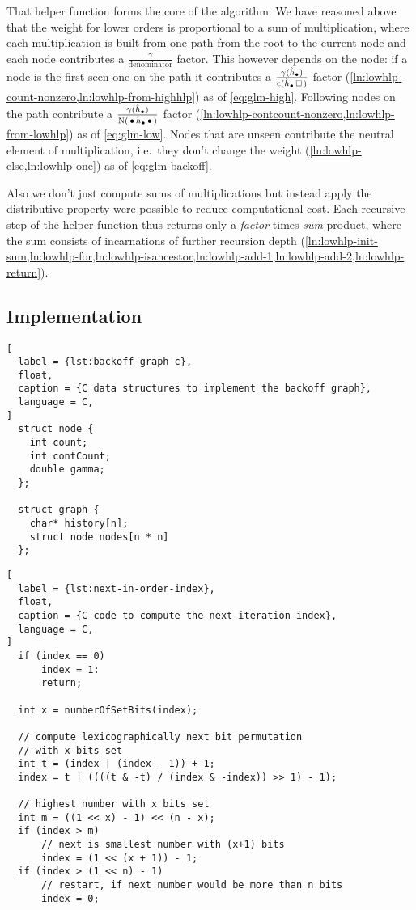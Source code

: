 That helper function  forms the core of the algorithm.
We have reasoned above that the weight for lower orders is proportional to
a sum of multiplication, where each multiplication is built from one path
from the root to the current node and each node contributes a
$\frac{\gamma}{\text{denominator}}$ factor.
This however depends on the node: if a node is the first seen one on the path
it contributes a
$\frac{\gamma(\DerivedHistory[\DummyIndex])}{\Count(\DerivedHistory[\DummyIndex] \Skp)}$
factor (\cref{ln:lowhlp-count-nonzero,ln:lowhlp-from-highhlp}) as of
\cref{eq:glm-high}. Following nodes on the path contribute a
$\frac{\gamma(\DerivedHistory[\DummyIndex])}{\ContCount(\WSkp \DerivedHistory[\DummyIndex] \WSkp)}$
factor (\cref{ln:lowhlp-contcount-nonzero,ln:lowhlp-from-lowhlp}) as of
\cref{eq:glm-low}.
Nodes that are unseen contribute the neutral element of multiplication, i.e.\
they don't change the weight (\cref{ln:lowhlp-else,ln:lowhlp-one}) as of
\cref{eq:glm-backoff}.

Also we don't just compute sums of multiplications but instead apply
the distributive property were possible to reduce computational cost.
Each recursive step of the helper function thus returns only a \emph{factor}
times \emph{sum} product, where the sum consists of incarnations of further
recursion depth
(\cref{ln:lowhlp-init-sum,ln:lowhlp-for,ln:lowhlp-isancestor,ln:lowhlp-add-1,ln:lowhlp-add-2,ln:lowhlp-return}).

\subsection{Implementation}
\label{subsec:weightedsum-glm-implementation}

\begin{lstlisting}[
  label = {lst:backoff-graph-c},
  float,
  caption = {C data structures to implement the backoff graph},
  language = C,
]
  struct node {
    int count;
    int contCount;
    double gamma;
  };

  struct graph {
    char* history[n];
    struct node nodes[n * n]
  };
\end{lstlisting}

\begin{lstlisting}[
  label = {lst:next-in-order-index},
  float,
  caption = {C code to compute the next iteration index},
  language = C,
]
  if (index == 0)
      index = 1:
      return;

  int x = numberOfSetBits(index);

  // compute lexicographically next bit permutation
  // with x bits set
  int t = (index | (index - 1)) + 1;
  index = t | ((((t & -t) / (index & -index)) >> 1) - 1);

  // highest number with x bits set
  int m = ((1 << x) - 1) << (n - x);
  if (index > m)
      // next is smallest number with (x+1) bits
      index = (1 << (x + 1)) - 1;
  if (index > (1 << n) - 1)
      // restart, if next number would be more than n bits
      index = 0;
\end{lstlisting}

